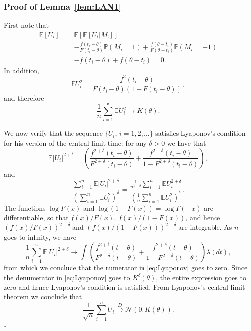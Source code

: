 \documentclass[letterpaper, conference, 11pt]{IEEEtran}      %
\newcommand*{\QEDA}{\hfill\ensuremath{\square}}
\begin{document}
\subsubsection*{Proof of Lemma~\ref{lem:LAN1}} 
First note that 
\begin{align*}
\mathbb E  [U_i] & = \mathbb E\left[ \mathbb E  [U_i|M_i] \right] \\
& =  -\frac{f(t_i-\theta)}{F(t_i-\theta)} \mathbb P (M_i=1) + \frac{f(\theta-t_i)}{F(\theta-t_i)} \mathbb P (M_i=-1) \\
& = -f(t_i-\theta) + f(\theta-t_i) = 0.
\end{align*}
In addition,
\[
\mathbb E U_i^2 = \frac{ f^2 \left( t_i-\theta \right) } { F \left( t_i-\theta \right) \left(1- F \left( t_i-\theta \right) \right)},
\]
and therefore
\[
\frac{1}{n} \sum_{i=1}^n \mathbb E U_i^2 \rightarrow K(\theta).
\]

We now verify that the sequence $\{ U_i,\,i=1,2,\ldots \}$ satisfies Lyaponov's condition for his version of the central limit time: for any $\delta>0$ we have that 
\[
\mathbb E \left| U_i \right|^{2+\delta} = \left( \frac{f^{2+\delta} \left(t_i-\theta \right)  }{F^{2+\delta} \left( t_i-\theta \right)} + \frac{f^{2+\delta} \left(t_i-\theta \right)  }{1-F^{2+\delta} \left(t_i-\theta\right)} \right),
\]
and
\begin{equation}
\frac{\sum_{i=1}^n \mathbb E \left| U_i \right|^{2+\delta} } { \left( \sum_{i=1}^n \mathbb E U_i^2  \right)^\delta} = 
\frac{ \frac{1}{n^{1+\delta}} \sum_{i=1}^n \mathbb E U_i^{2+\delta} }{ \left(\frac{1}{n} \sum_{i=1}^n \mathbb E U_i^2  \right)^\delta}. 
\label{eq:Lyaponov}
\end{equation}
The functions $\log F(x)$ and $\log (1-F(x)) = \log F(-x)$ are differentiable, so that $f(x)/F(x)$, $f(x)/(1-F(x))$, and hence $\left(f(x)/F(x)\right)^{2+\delta}$ and $\left(f(x)/(1-F(x)) \right)^{2+\delta}$ are integrable. As $n$ goes to infinity, we have
\[
\frac{1}{n}\sum_{i=1}^n \mathbb E \left| U_i \right|^{2+\delta}  \rightarrow  \int \left( \frac{ f^{2+\delta} \left(t-\theta\right)}{F^{2+\delta}\left(t-\theta\right)} + \frac{ f^{2+\delta} \left(t-\theta\right)}{1-F^{2+\delta} \left(t-\theta\right)} \right) \lambda(dt),
\]
from which we conclude that the numerator in \eqref{eq:Lyaponov} goes to zero. Since the denumerator in \eqref{eq:Lyaponov} goes to $K^\delta(\theta)$, the entire expression goes to zero and hence Lyaponov's condition is satisfied. From Lyaponov's central limit theorem we conclude that 
\[
\frac{1}{\sqrt{n}} \sum_{i=1}^n U_i \overset{D}{\rightarrow} \mathcal N\left(0,K(\theta) \right). 
\]
\QEDA
\end{document}
